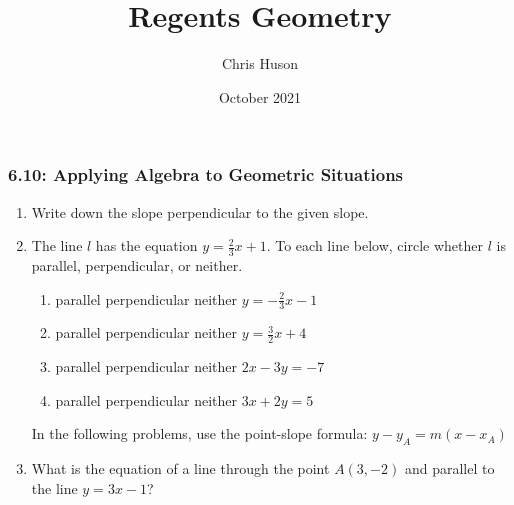 \documentclass[12pt, twoside]{article}
\title{Regents Geometry}
\author{Chris Huson}
\date{October 2021}
\begin{document}
\subsubsection*{6.10: Applying Algebra to Geometric Situations}
\begin{enumerate}
\item Write down the slope perpendicular to the given slope. \vspace{0.5cm}
  \begin{enumerate}
  \end{enumerate}

\item The line $l$ has the equation $y=\frac{2}{3}x+1$. To each line below, circle whether $l$ is parallel, perpendicular, or neither.
  \begin{enumerate}
    \item parallel \quad perpendicular \quad neither \qquad $y=-\frac{2}{3}x-1$
    \vspace{0.5cm}
    \item parallel \quad perpendicular \quad neither \qquad $y=\frac{3}{2}x+4$
    \vspace{0.5cm}
    \item parallel \quad perpendicular \quad neither \qquad $2x-3y=-7$
    \vspace{1.5cm}
    \item parallel \quad perpendicular \quad neither \qquad $3x+2y=5$
    \vspace{1.7cm}
  \end{enumerate}

In the following problems, use the point-slope formula: $y-y_A=m (x-x_A)$
  \item What is the equation of a line through the point $A(3,-2)$ and parallel to the line $y=3x-1$?  \vspace{1.5cm}


\end{enumerate}
\end{document}
